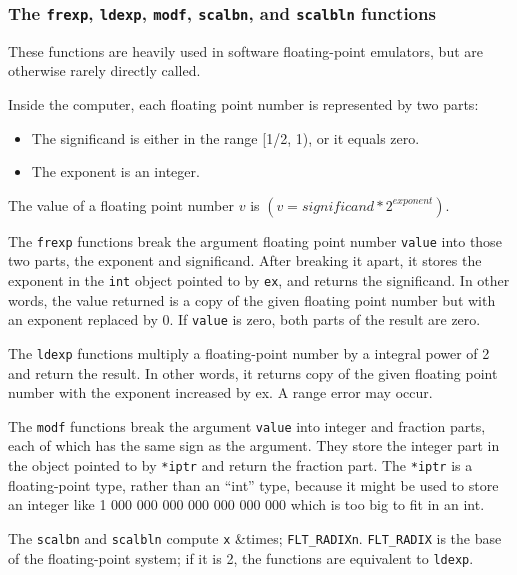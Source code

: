 \subsubsection{The \texttt{frexp}, \texttt{ldexp}, \texttt{modf},
\texttt{scalbn}, and \texttt{scalbln} functions}
These functions are heavily used in software floating-point emulators, but are
otherwise rarely directly called.

Inside the computer, each floating point number is represented by two parts:
\begin{itemize}
	\item The significand is either in the range [1/2, 1), or it equals zero.
	\item The exponent is an integer.
\end{itemize}

The value of a floating point number \(v\) is
$(v = significand * 2^{exponent})$.

The \texttt{frexp} functions break the argument floating point number
\texttt{value} into those two parts, the exponent and significand.  After
breaking it apart, it stores the exponent in the \texttt{int} object pointed to
by \texttt{ex}, and returns the significand.  In other words, the value
returned is a copy of the given floating point number but with an exponent
replaced by 0.  If \texttt{value} is zero, both parts of the result are zero.

The \texttt{ldexp} functions multiply a floating-point number by a integral
power of 2 and return the result.  In other words, it returns copy of the given
floating point number with the exponent increased by ex.  A range error may
occur.

The \texttt{modf} functions break the argument \texttt{value} into integer and
fraction parts, each of which has the same sign as the argument. They store the
integer part in the object pointed to by \texttt{*iptr} and return the fraction
part.  The \texttt{*iptr} is a floating-point type, rather than an ``int''
type, because it might be used to store an integer like 1 000 000 000 000 000
000 000 which is too big to fit in an int.

The \texttt{scalbn} and \texttt{scalbln} compute \texttt{x} \&times;
\texttt{FLT\_RADIX\texttt{n}}.
\texttt{FLT\_RADIX} is the base of the floating-point system; if it is 2, the
functions are equivalent to \texttt{ldexp}.

